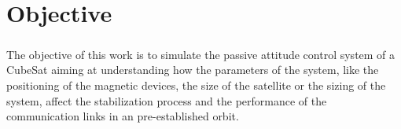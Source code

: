 %
%
%
%
%

%
%
%
%
%
%

\chapter{Objective} \label{ch:objective}

\paragraph{}
\indent 
    The objective of this work is to simulate the passive attitude control system of a CubeSat aiming at understanding how the parameters of the system, like the positioning of the magnetic devices, the size of the satellite or the sizing of the system, affect the stabilization process and the performance of the communication links in an pre-established orbit.
